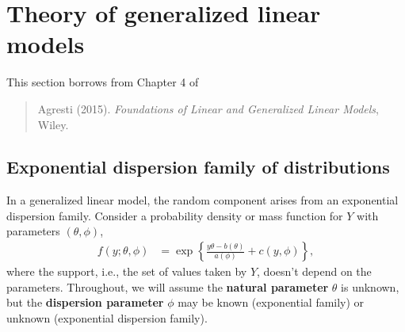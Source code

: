 \documentclass[
  11pt,
  letterpaper,
]{book}
\theoremstyle{definition}
\theoremstyle{definition}
\theoremstyle{definition}
\theoremstyle{remark}
\begin{document}
\hypertarget{theory-of-generalized-linear-models}{%
\section{Theory of generalized linear models}\label{theory-of-generalized-linear-models}}

This section borrows from Chapter 4 of

\begin{quote}
Agresti (2015). \emph{Foundations of Linear and Generalized Linear Models}, Wiley.
\end{quote}

\hypertarget{exponential-dispersion-family-of-distributions}{%
\subsection{Exponential dispersion family of distributions}\label{exponential-dispersion-family-of-distributions}}

In a generalized linear model, the random component arises from an
exponential dispersion family. Consider a probability density or mass
function for \(Y\) with parameters \((\theta, \phi)\), \begin{align}
f(y; \theta, \phi)&= \exp \left\{  \frac{y \theta -b(\theta)}{a(\phi)} + c(y, \phi)\right\}, 
\label{eq:expofam}
\end{align}
where the support, i.e., the set of values taken by \(Y\),
doesn't depend on the parameters. Throughout, we will assume the
\textbf{natural parameter} \(\theta\) is unknown, but the \textbf{dispersion
parameter} \(\phi\) may be known (exponential family) or unknown
(exponential dispersion family).
\end{document}
